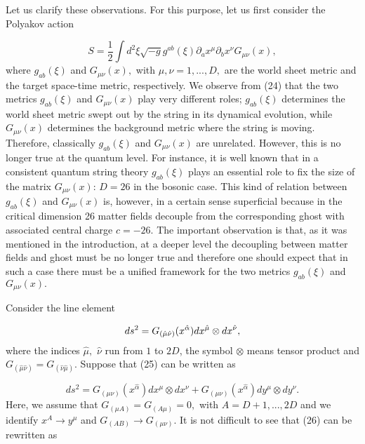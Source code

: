 \documentclass[a4paper,12pt]{article}
\begin{document}
Let us clarify these observations. For this purpose, let us first consider
the Polyakov action

\begin{equation}
S=\frac{1}{2}\int d^{2}\xi \sqrt{-g}g^{ab}(\xi )\partial _{a}x^{\mu
}\partial _{b}x^{\nu }G_{\mu \nu }(x),  \label{24}
\end{equation}
where $g_{ab}(\xi )$ and $G_{\mu \nu }(x),$ with $\mu ,\nu =1,...,D,$ are
the world sheet metric and the target space-time metric, respectively. We
observe from (24) that the two metrics $g_{ab}(\xi )$ and $G_{\mu \nu }(x)$
play very different roles; $g_{ab}(\xi )$ determines the world sheet metric
swept out by the string in its dynamical evolution, while $G_{\mu \nu }(x)$
determines the background metric where the string is moving. Therefore,
classically $g_{ab}(\xi )$ and $G_{\mu \nu }(x)$ are unrelated. However,
this is no longer true at the quantum level. For instance, it is well known
that in a consistent quantum string theory $g_{ab}(\xi )$ plays an essential
role to fix the size of the matrix $G_{\mu \nu }(x)$: $D=26$ in the bosonic
case. This kind of relation between $g_{ab}(\xi )$ and $G_{\mu \nu }(x)$ is,
however, in a certain sense superficial because in the critical dimension 26
matter fields decouple from the corresponding ghost with associated central
charge $c=-26.$ The important observation is that, as it was mentioned in
the introduction, at a deeper level the decoupling between matter fields and
ghost must be no longer true and therefore one should expect that in such a
case there must be a unified framework for the two metrics $g_{ab}(\xi )$
and $G_{\mu \nu }(x).$

Consider the line element

\begin{equation}
ds^{2}=G_{(\hat{\mu}\hat{\nu})}(x^{\hat{\alpha}})dx^{\hat{\mu}}\otimes dx^{%
\hat{\nu}},  \label{25}
\end{equation}
where the indices $\hat{\mu},$ $\hat{\nu}$ run from $1$ to $2D$, the symbol $%
\otimes $ means tensor product and $G_{(\hat{\mu}\hat{\nu})}=G_{(\hat{\nu}%
\hat{\mu})}$. Suppose that (25) can be written as

\begin{equation}
ds^{2}=G_{(\mu \nu )}(x^{\hat{\alpha}})dx^{\mu }\otimes dx^{\nu }+G_{(\mu
\nu )}(x^{\hat{\alpha}})dy^{\mu }\otimes dy^{\nu }.  \label{26}
\end{equation}
Here, we assume that $G_{(\mu A)}=G_{(A\mu )}=0,$ with $A=D+1,...,2D$ and we
identify $x^{A}\rightarrow y^{\mu }$ and $G_{(AB)}\rightarrow G_{(\mu \nu
)}. $ It is not difficult to see that (26) can be rewritten as
\end{document}
